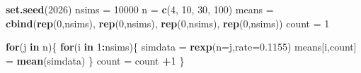 \documentclass[
  11pt,
  oneside]{book}
\newenvironment{Shaded}{\begin{snugshade}}{\end{snugshade}}
\newcommand{\AttributeTok}[1]{\textcolor[rgb]{0.13,0.29,0.53}{#1}}
\newcommand{\ControlFlowTok}[1]{\textcolor[rgb]{0.13,0.29,0.53}{\textbf{#1}}}
\newcommand{\DecValTok}[1]{\textcolor[rgb]{0.00,0.00,0.81}{#1}}
\newcommand{\FloatTok}[1]{\textcolor[rgb]{0.00,0.00,0.81}{#1}}
\newcommand{\FunctionTok}[1]{\textcolor[rgb]{0.13,0.29,0.53}{\textbf{#1}}}
\newcommand{\NormalTok}[1]{#1}
\newcommand{\OtherTok}[1]{\textcolor[rgb]{0.56,0.35,0.01}{#1}}
\newcommand{\SpecialCharTok}[1]{\textcolor[rgb]{0.81,0.36,0.00}{\textbf{#1}}}
\theoremstyle{definition}
\theoremstyle{definition}
\theoremstyle{definition}
\theoremstyle{definition}
\theoremstyle{remark}
\begin{document}
\begin{Shaded}
\begin{Highlighting}[]
\FunctionTok{set.seed}\NormalTok{(}\DecValTok{2026}\NormalTok{)}
\NormalTok{nsims }\OtherTok{=} \DecValTok{10000}
\NormalTok{n }\OtherTok{=} \FunctionTok{c}\NormalTok{(}\DecValTok{4}\NormalTok{, }\DecValTok{10}\NormalTok{, }\DecValTok{30}\NormalTok{, }\DecValTok{100}\NormalTok{)}
\NormalTok{means }\OtherTok{=} \FunctionTok{cbind}\NormalTok{(}\FunctionTok{rep}\NormalTok{(}\DecValTok{0}\NormalTok{,nsims), }\FunctionTok{rep}\NormalTok{(}\DecValTok{0}\NormalTok{,nsims), }\FunctionTok{rep}\NormalTok{(}\DecValTok{0}\NormalTok{,nsims), }\FunctionTok{rep}\NormalTok{(}\DecValTok{0}\NormalTok{,nsims))}
\NormalTok{count }\OtherTok{=} \DecValTok{1}

\ControlFlowTok{for}\NormalTok{(j }\ControlFlowTok{in}\NormalTok{ n)\{}
\ControlFlowTok{for}\NormalTok{(i }\ControlFlowTok{in} \DecValTok{1}\SpecialCharTok{:}\NormalTok{nsims)\{}
\NormalTok{  simdata }\OtherTok{=} \FunctionTok{rexp}\NormalTok{(}\AttributeTok{n=}\NormalTok{j,}\AttributeTok{rate=}\FloatTok{0.1155}\NormalTok{)}
\NormalTok{  means[i,count] }\OtherTok{=} \FunctionTok{mean}\NormalTok{(simdata)}
\NormalTok{\}}
\NormalTok{  count }\OtherTok{=}\NormalTok{ count }\SpecialCharTok{+}\DecValTok{1}
\NormalTok{\}}


\end{Highlighting}
\end{Shaded}
\end{document}
